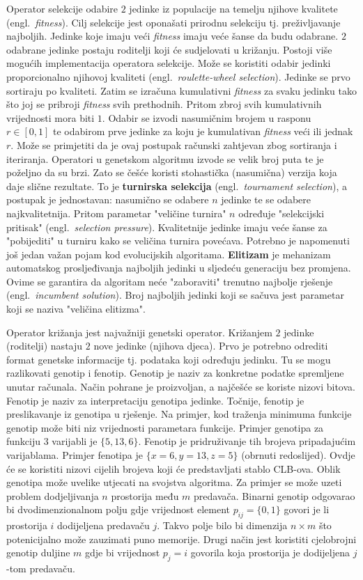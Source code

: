 \documentclass[times, utf8, diplomski]{fer}
\begin{document}
Operator selekcije odabire $2$ jedinke iz populacije na temelju njihove kvalitete (engl.~\textit{fitness}). Cilj selekcije jest oponašati prirodnu selekciju tj. preživljavanje najboljih. Jedinke koje imaju veći \textit{fitness} imaju veće šanse da budu odabrane. $2$ odabrane jedinke postaju roditelji koji će sudjelovati u križanju. Postoji više mogućih implementacija operatora selekcije. Može se koristiti odabir jedinki proporcionalno njihovoj kvaliteti (engl.~\textit{roulette-wheel selection}). Jedinke se prvo sortiraju po kvaliteti. Zatim se izračuna kumulativni \textit{fitness} za svaku jedinku tako što joj se pribroji \textit{fitness} svih prethodnih. Pritom zbroj svih kumulativnih vrijednosti mora biti $1$. Odabir se izvodi nasumičnim brojem u rasponu $r \in [0, 1]$ te odabirom prve jedinke za koju je kumulativan \textit{fitness} veći ili jednak $r$. Može se primjetiti da je ovaj postupak računski zahtjevan zbog sortiranja i iteriranja. Operatori u genetskom algoritmu izvode se velik broj puta te je poželjno da su brzi. Zato se češće koristi stohastička (nasumična) verzija koja daje slične rezultate. To je \textbf{turnirska selekcija} (engl.~\textit{tournament selection}), a postupak je jednostavan: nasumično se odabere $n$ jedinke te se odabere najkvalitetnija. Pritom parametar "veličine turnira" $n$ određuje "selekcijski pritisak" (engl.~\textit{selection pressure}).  Kvalitetnije jedinke imaju veće šanse za "pobijediti" u turniru kako se veličina turnira povećava. Potrebno je napomenuti još jedan važan pojam kod evolucijskih algoritama. \textbf{Elitizam} je mehanizam automatskog prosljeđivanja najboljih jedinki u sljedeću generaciju bez promjena. Ovime se garantira da algoritam neće "zaboraviti" trenutno najbolje rješenje (engl.~\textit{incumbent solution}). Broj najboljih jedinki koji se sačuva jest parametar koji se naziva "veličina elitizma".

Operator križanja jest najvažniji genetski operator. Križanjem $2$ jedinke (roditelji) nastaju $2$ nove jedinke (njihova djeca). Prvo je potrebno odrediti format genetske informacije tj. podataka koji određuju jedinku. Tu se mogu razlikovati genotip i fenotip. Genotip je naziv za konkretne podatke spremljene unutar računala. Način pohrane je proizvoljan, a najčešće se koriste nizovi bitova. Fenotip je naziv za interpretaciju genotipa jedinke. Točnije, fenotip je preslikavanje iz genotipa u rješenje. Na primjer, kod traženja minimuma funkcije genotip može biti niz vrijednosti parametara funkcije. Primjer genotipa za funkciju $3$ varijabli je $\{5, 13, 6\}$. Fenotip je pridruživanje tih brojeva pripadajućim varijablama. Primjer fenotipa je $\{x=6, y=13, z=5\}$ (obrnuti redoslijed). Ovdje će se koristiti nizovi cijelih brojeva koji će predstavljati stablo CLB-ova. Oblik genotipa može uvelike utjecati na svojstva algoritma. Za primjer se može uzeti problem dodjeljivanja $n$ prostorija među $m$ predavača. Binarni genotip odgovarao bi dvodimenzionalnom polju gdje vrijednost element $p_{ij}=\{0, 1\}$ govori je li prostorija $i$ dodijeljena predavaču $j$. Takvo polje bilo bi dimenzija $n \times m$ što potenicijalno može zauzimati puno memorije. Drugi način jest koristiti cjelobrojni genotip duljine $m$ gdje bi vrijednost $p_{j}=i$ govorila koja prostorija je dodijeljena $j$-tom predavaču.
\end{document}
